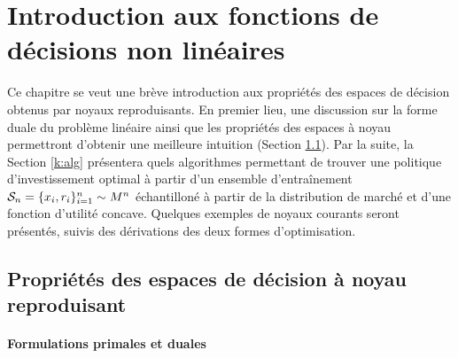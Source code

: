 \section{Introduction aux fonctions de décisions non linéaires}

Ce chapitre se veut une brève introduction aux propriétés des espaces de décision obtenus
par noyaux reproduisants. En premier lieu, une discussion sur la forme duale du problème
linéaire ainsi que les propriétés des espaces à noyau permettront d'obtenir une meilleure
intuition (Section \ref{k:def}). Par la suite, la Section \ref{k:alg} présentera quels
algorithmes permettant de trouver une politique d'investissement optimal à partir d'un
ensemble d'entraînement $\S_n = \{x_i,r_i\}_{i=1}^n \sim M^n$ échantilloné à partir de la
distribution de marché et d'une fonction d'utilité concave. Quelques exemples de noyaux
courants seront présentés, suivis des dérivations des deux formes d'optimisation.



\subsection{Propriétés des espaces de décision à noyau reproduisant}
\label{k:def}

\paragraph{Formulations primales et duales}

